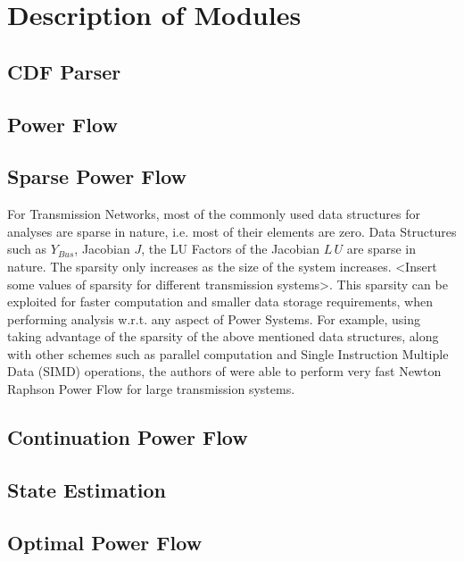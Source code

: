 \documentclass[varwidth]{standalone}
\providecommand{\powerflow}[1]{Power Flow}
\providecommand{\sparse}[1]{Sparse Power Flow}
\providecommand{\cpf}[1]{Continuation Power Flow}
\providecommand{\se}[1]{State Estimation}
\providecommand{\opf}[1]{Optimal Power Flow}
\begin{document}
\section{Description of Modules}

\subsection{CDF Parser}

\subsection{\powerflow{}}

\subsection{\sparse{}}
    For Transmission Networks, most of the commonly used data structures for analyses are sparse in nature, i.e. most of their elements are zero. Data Structures such as $Y_{Bus}$, Jacobian $J$, the LU Factors of the Jacobian $L \, U$ are sparse in nature. The sparsity only increases as the size of the system increases. <Insert some values of sparsity for different transmission systems>. This sparsity can be exploited for faster computation and smaller data storage requirements, when performing analysis w.r.t. any aspect of Power Systems. For example, using taking advantage of the sparsity of the above mentioned data structures, along with other schemes such as parallel computation and Single Instruction Multiple Data (SIMD) operations, the authors of \cite{Ahmadi2021Sep} were able to perform very fast Newton Raphson Power Flow for large transmission systems.

\subsection{\cpf{}}

\subsection{\se{}}

\subsection{\opf{}}
\end{document}
